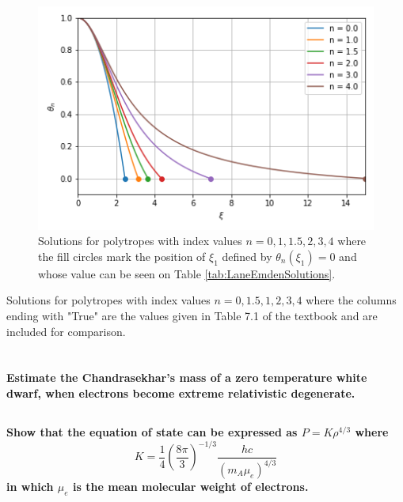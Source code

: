\begin{figure}
    \centering
    \includegraphics{CodeAndFigures/Astro643Hw3P2Plot.png}
    \caption{Solutions for polytropes with index values $n=0,1,1.5,2,3,4$ where the fill circles mark the position of $\xi_1$ defined by $\theta_n(\xi_1)=0$ and whose value can be seen on Table \ref{tab:LaneEmdenSolutions}.}
    \label{fig:LaneEmdenSolutions}
\end{figure}

\begin{table}[ht]
    \centering
    
    \caption{Solutions for polytropes with index values $n=0,1.5,1,2,3,4$ where the columns ending with "True" are the values given in Table 7.1 of the textbook and are included for comparison.}
    \label{tab:LaneEmdenSolutions}
\end{table}


\section{}
\textbf{Estimate the Chandrasekhar's mass of a zero temperature white dwarf, when electrons become extreme relativistic degenerate.}
\subsection{}
\textbf{Show that the equation of state can be expressed as $P=K\rho^{4/3}$ where
\begin{equation*}
    K = \frac{1}{4}\left(\frac{8\pi}{3}\right)^{-1/3}\frac{hc}{(m_A\mu_e)^{4/3}}
\end{equation*}
in which $\mu_e$ is the mean molecular weight of electrons.}


